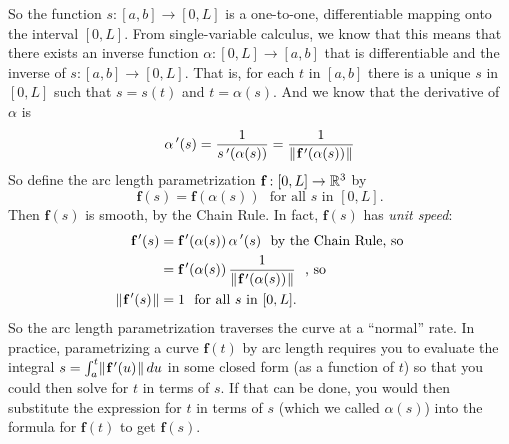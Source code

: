 So the function $s:[a,b] \rightarrow [0,L]$ is a one-to-one, differentiable mapping onto the interval $[0,L]$. From
single-variable calculus, we know that this means that there exists an inverse function $\alpha:[0,L] \rightarrow [a,b]$
that is differentiable and the inverse of $s:[a,b] \rightarrow [0,L]$. That is, for each $t$ in $[a,b]$
there is a unique $s$ in $[0,L]$ such that $s = s(t)$ and $t = \alpha(s)$. And we know that the derivative of $\alpha$
is
\begin{displaymath}
 \alpha\,'(s) = \dfrac{1}{s\,'(\alpha(s))} = \dfrac{1}{\lVert\mspace{1mu}\textbf{f}\,'(\alpha(s))\mspace{1mu}\rVert}
\end{displaymath}
So define the arc length parametrization $\textbf{f}:[0,L] \rightarrow \mathbb{R}^{3}$ by
\begin{displaymath}
 \textbf{f}(s) = \textbf{f}(\alpha(s)) \text{~~for all $s$ in $[0,L]$.}
\end{displaymath}
Then $\textbf{f}(s)$ is smooth, by the Chain Rule. In fact, $\textbf{f}(s)$ has \emph{unit speed}:
\begin{align*}
 \textbf{f}\,'(s) &= \textbf{f}\,'(\alpha(s))\,\alpha\,'(s) \text{~~by the Chain Rule, so}\\
 &= \textbf{f}\,'(\alpha(s))\,\dfrac{1}{\lVert\mspace{1mu}\textbf{f}\,'(\alpha(s))\mspace{1mu}\rVert} \text{~~, so}\\
 \lVert\mspace{1mu}\textbf{f}\,'(s)\mspace{1mu}\rVert &= 1 \text{~~for all $s$ in $[0,L]$.}
\end{align*}
So the arc length parametrization traverses the curve at a ``normal'' rate.
\newpage
In practice, parametrizing a curve $\textbf{f}(t)$ by arc length requires you to evaluate the integral $s = \int_{a}^{t}
\lVert\mspace{1mu}\textbf{f}\,'(u)\mspace{1mu}\rVert\,du$ in some closed form (as a function of $t$) so that you could then solve for $t$ in terms of
$s$. If that can be done, you would then substitute the expression for $t$ in terms of $s$ (which we called $\alpha(s)$)
into the formula for $\textbf{f}(t)$ to get $\textbf{f}(s)$.

